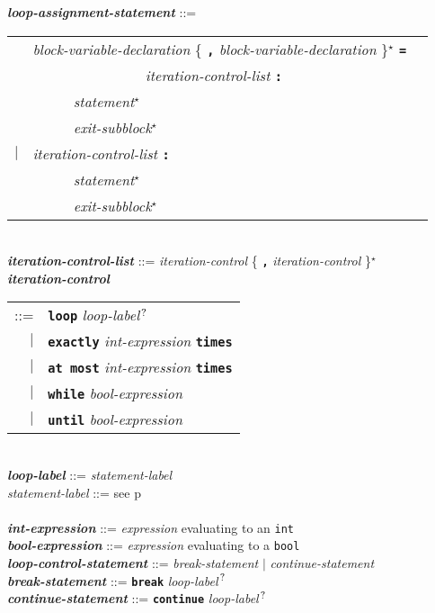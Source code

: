 \documentclass[12pt]{article}
\newcommand{\TT}[1]{{\tt \bfseries #1}}
\newcommand{\STAR}{{\Large $^\star$}}
\newcommand{\QMARK}{{$^{\,\mbox{\footnotesize ?}}$}}
\newcommand{\ttkey}[1]{{\tt \bfseries #1}}
\newcommand{\emkey}[1]{{\em \bfseries #1}}
\newcommand{\pagref}[1]{p\pageref{#1}}
\newenvironment{indpar}[1][0.3in]%
	{\begin{list}{}%
		     {\setlength{\itemsep}{0in}%
		      \setlength{\topsep}{0in}%
		      \setlength{\parsep}{1ex}%
		      \setlength{\labelwidth}{#1}%
		      \setlength{\leftmargin}{#1}%
		      \addtolength{\leftmargin}{\labelsep}}%
	 \item}%
	{\end{list}}
\begin{document}
\begin{indpar}
\emkey{loop-assignment-statement} ::= \\
\hspace*{0.5in}
    \begin{tabular}[t]{@{}rll}
        & {\em block-variable-declaration}
                \{ \TT{,} {\em block-variable-declaration} \}\STAR{}
		\TT{=} \\
	& ~~~~~~~~~~~~~~~ {\em iteration-control-list} \TT{:} \\
        & ~~~~~ {\em statement}\STAR{} \\
        & ~~~~~ {\em exit-subblock}\STAR{} \\
    $|$ & {\em iteration-control-list} \TT{:} \\
        & ~~~~~ {\em statement}\STAR{} \\
        & ~~~~~ {\em exit-subblock}\STAR{} \\
    \end{tabular}
\\[0.5ex]
\emkey{iteration-control-list} ::=
    {\em iteration-control} \{ \TT{,} {\em iteration-control} \}\STAR{}
\\[0.5ex]
\emkey{iteration-control}\label{ITERATION-CONTROL}
    \begin{tabular}[t]{rl}
     ::= & \ttkey{loop} {\em loop-label}\QMARK{} \\
     $|$ & \ttkey{exactly} {\em int-expression} \ttkey{times} \\
     $|$ & \ttkey{at most} {\em int-expression} \ttkey{times} \\
     $|$ & \ttkey{while} {\em bool-expression} \\
     $|$ & \ttkey{until} {\em bool-expression} \\
     \end{tabular}
\\[0.5ex]
\emkey{loop-label} ::= {\em statement-label}
\\[0.5ex]
{\em statement-label} ::= see \pagref{STATEMENT-LABEL} \\
\\[0.5ex]
\emkey{int-expression} ::= {\em expression} evaluating to an {\tt int}
\\[0.5ex]
\emkey{bool-expression}\label{BOOL-EXPRESSION} ::=
    {\em expression} evaluating to a {\tt bool}
\\[0.5ex]
\emkey{loop-control-statement}\label{LOOP-CONTROL-STATEMENT} ::=
    {\em break-statement} $|$ {\em continue-statement}
\\[0.5ex]
\emkey{break-statement}\label{BREAK-STATEMENT} ::=
    \ttkey{break} {\em loop-label}\QMARK{}
\\[0.5ex]
\emkey{continue-statement}\label{CONTINUE-STATEMENT} ::=
    \ttkey{continue} {\em loop-label}\QMARK{}
\end{indpar}
\end{document}
